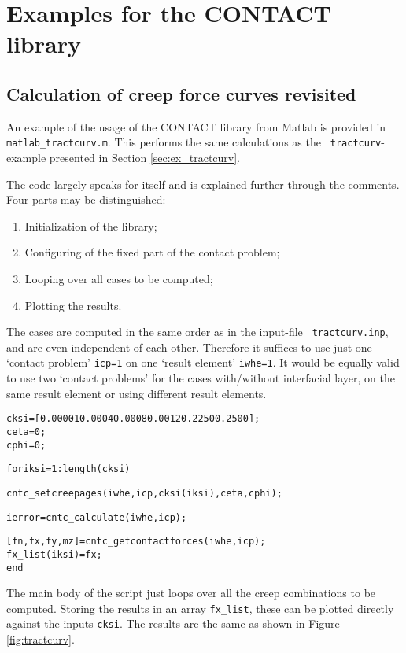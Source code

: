 \documentclass[12pt]{report}
\begin{document}
\section{Examples for the CONTACT library}

\subsection{Calculation of creep force curves revisited}
\label{sec:clib_tract}

An example of the usage of the CONTACT library from Matlab is provided in
{\tt matlab\_\-tract\-curv.m}. This performs the same calculations as the {\tt
tractcurv}-example presented in Section \ref{sec:ex_tractcurv}. 

The code largely speaks for itself and is explained further through the
comments. Four parts may be distinguished:
\begin{enumerate}
\item Initialization of the library;
\item Configuring of the fixed part of the contact problem;
\item Looping over all cases to be computed;
\item Plotting the results.
\end{enumerate} 
The cases are computed in the same order as in the input-file {\tt
tractcurv.inp}, and are even independent of each other. Therefore it
suffices to use just one `contact problem' {\tt icp=1} on one
`result element' {\tt iwhe=1}. It would be equally valid to use two
`contact problems' for the cases with/without interfacial layer, on
the same result element or using different result elements.
\begin{alltt}\small
% creepages: a list of values for creating a creep-force curve

cksi = [ 0.00001 0.0004 0.0008 0.0012     0.2250 0.2500 ];  % [-]
ceta = 0; % [-]
cphi = 0; % [rad/mm]

for iksi = 1:length(cksi)

   % set creepages according to next value from cksi
   cntc_setcreepages(iwhe, icp, cksi(iksi), ceta, cphi);

   % compute the contact problem
   ierror = cntc_calculate(iwhe, icp);

   % get forces on upper body (1) (CONTACT unit convention)
   [fn, fx, fy, mz] = cntc_getcontactforces(iwhe, icp);
   fx_list(iksi) = fx;
end
\end{alltt}
The main body of the script just loops over all the creep combinations to
be computed. Storing the results in an array {\tt fx\_list}, these can be
plotted directly against the inputs {\tt cksi}. 
The results are the same as shown in Figure \ref{fig:tractcurv}.
\end{document}
